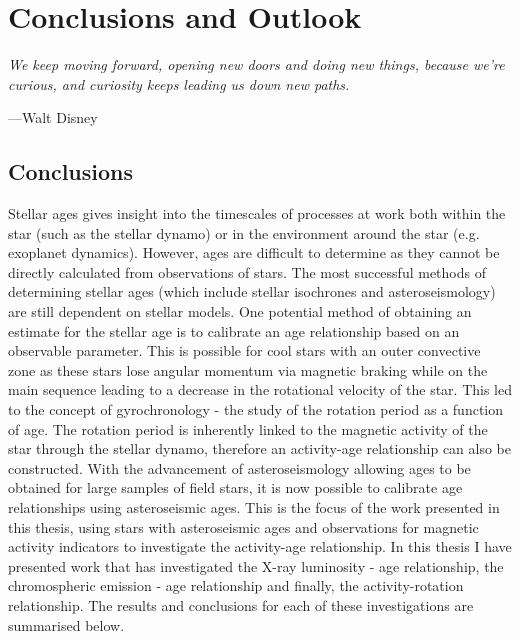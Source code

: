 
\chapter{Conclusions and Outlook} %

\label{Chapter6} %


\epigraph{\itshape We keep moving forward, opening new doors and doing new things, because we're curious, and curiosity keeps leading us down new paths.}{---Walt Disney}

\section{Conclusions}

Stellar ages gives insight into the timescales of processes at work both within the star (such as the stellar dynamo) or in the environment around the star (e.g. exoplanet dynamics). However, ages are difficult to determine as they cannot be directly calculated from observations of stars. The most successful methods of determining stellar ages (which include stellar isochrones and asteroseismology) are still dependent on stellar models. One potential method of obtaining an estimate for the stellar age is to calibrate an age relationship based on an observable parameter. This is possible for cool stars with an outer convective zone as these stars lose angular momentum via magnetic braking while on the main sequence leading to a decrease in the rotational velocity of the star. This led to the concept of gyrochronology - the study of the rotation period as a function of age. The rotation period is inherently linked to the magnetic activity of the star through the stellar dynamo, therefore an activity-age relationship can also be constructed. With the advancement of asteroseismology allowing ages to be obtained for large samples of field stars, it is now possible to calibrate age relationships using asteroseismic ages. This is the focus of the work presented in this thesis, using stars with asteroseismic ages and observations for magnetic activity indicators to investigate the activity-age relationship. In this thesis I have presented work that has investigated the X-ray luminosity - age relationship, the chromospheric emission - age relationship and finally, the activity-rotation relationship. The results and conclusions for each of these investigations are summarised below.

